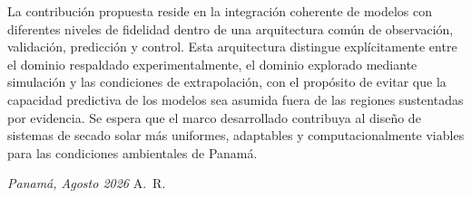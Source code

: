 La contribución propuesta reside en la integración coherente de modelos con diferentes niveles de fidelidad dentro de una arquitectura común de observación, validación, predicción y control. Esta arquitectura distingue explícitamente entre el dominio respaldado experimentalmente, el dominio explorado mediante simulación y las condiciones de extrapolación, con el propósito de evitar que la capacidad predictiva de los modelos sea asumida fuera de las regiones sustentadas por evidencia. Se espera que el marco desarrollado contribuya al diseño de sistemas de secado solar más uniformes, adaptables y computacionalmente viables para las condiciones ambientales de Panamá.




\bigskip
 
\noindent\textit{Panamá, Agosto 2026}
\hfill A.~R.
